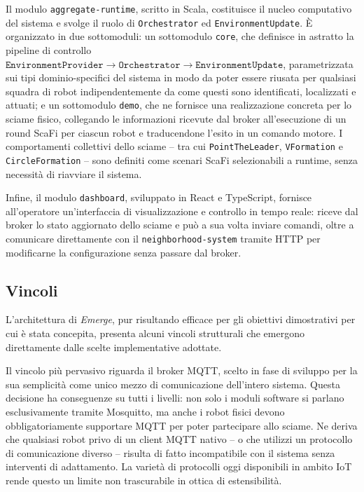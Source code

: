 Il modulo \texttt{aggregate-runtime}, scritto in Scala, costituisce il nucleo computativo del sistema e svolge il ruolo di \texttt{Orchestrator} ed \texttt{EnvironmentUpdate}. È organizzato in due sottomoduli: un sottomodulo \texttt{core}, che definisce in astratto la pipeline di controllo $\texttt{EnvironmentProvider} \to \texttt{Orchestrator} \to \texttt{EnvironmentUpdate}$, parametrizzata sui tipi dominio-specifici del sistema in modo da poter essere riusata per qualsiasi squadra di robot indipendentemente da come questi sono identificati, localizzati e attuati; e un sottomodulo \texttt{demo}, che ne fornisce una realizzazione concreta per lo sciame fisico, collegando le informazioni ricevute dal broker all'esecuzione di un round ScaFi per ciascun robot e traducendone l'esito in un comando motore. I comportamenti collettivi dello sciame -- tra cui \texttt{PointTheLeader}, \texttt{VFormation} e \texttt{CircleFormation} -- sono definiti come scenari ScaFi selezionabili a runtime, senza necessità di riavviare il sistema.

Infine, il modulo \texttt{dashboard}, sviluppato in React e TypeScript, fornisce all'operatore un'interfaccia di visualizzazione e controllo in tempo reale: riceve dal broker lo stato aggiornato dello sciame e può a sua volta inviare comandi, oltre a comunicare direttamente con il \texttt{neighborhood-system} tramite HTTP per modificarne la configurazione senza passare dal broker.
%
\subsection{Vincoli}
\label{subsec:vincoli}
%
L'architettura di \textit{Emerge}, pur risultando efficace per gli obiettivi dimostrativi per cui è stata concepita, presenta alcuni vincoli strutturali che emergono direttamente dalle scelte implementative adottate.

Il vincolo più pervasivo riguarda il broker \ac{MQTT}, scelto in fase di sviluppo per la sua semplicità come unico mezzo di comunicazione dell'intero sistema. Questa decisione ha conseguenze su tutti i livelli: non solo i moduli software si parlano esclusivamente tramite Mosquitto, ma anche i robot fisici devono obbligatoriamente supportare \ac{MQTT} per poter partecipare allo sciame. Ne deriva che qualsiasi robot privo di un client \ac{MQTT} nativo -- o che utilizzi un protocollo di comunicazione diverso -- risulta di fatto incompatibile con il sistema senza interventi di adattamento. La varietà di protocolli oggi disponibili in ambito IoT rende questo un limite non trascurabile in ottica di estensibilità.

